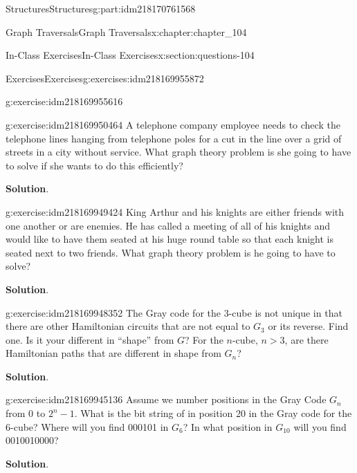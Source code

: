 \documentclass[oneside,10pt,]{book}
\newcommand{\blocktitlefont}{\relax}
\numberwithin{equation}{section}
\newcommand{\gt}{>}
\begin{document}
\begin{partptx}{Structures}{}{Structures}{}{}{g:part:idm218170761568}
\begin{chapterptx}{Graph Traversals}{}{Graph Traversals}{}{}{x:chapter:chapter_104}
\begin{sectionptx}{In-Class Exercises}{}{In-Class Exercises}{}{}{x:section:questions-104}
\begin{exercises-subsection-numberless}{Exercises}{}{Exercises}{}{}{g:exercises:idm218169955872}
\begin{exercisegroup}
\begin{divisionexerciseeg}{1}{}{}{g:exercise:idm218169955616}
\end{divisionexerciseeg}%
\begin{divisionexerciseeg}{2}{}{}{g:exercise:idm218169950464}%
A telephone company employee needs to check the telephone lines hanging from telephone poles for a cut in the line over a grid of streets in a city without service.  What graph theory problem is she going to have to solve if she wants to do this efficiently?%
\par\smallskip%
\noindent\textbf{\blocktitlefont Solution}.\hypertarget{g:solution:idm218169949680}{}\quad{}%
\end{divisionexerciseeg}%
\begin{divisionexerciseeg}{3}{}{}{g:exercise:idm218169949424}%
King Arthur and his knights are either friends with one another or are enemies.  He has called a meeting of all of his knights and would like to have them seated at his huge round table so that each knight is seated next to two friends. What graph theory problem is he going to have to solve?%
\par\smallskip%
\noindent\textbf{\blocktitlefont Solution}.\hypertarget{g:solution:idm218169948608}{}\quad{}%
\end{divisionexerciseeg}%
\begin{divisionexerciseeg}{4}{}{}{g:exercise:idm218169948352}%
The Gray code for the 3-cube is not unique in that there are other Hamiltonian circuits that are not equal to \(G_3\) or its reverse.  Find one.   Is it your different in ``shape'' from \(G\)?   For the \(n\)-cube, \(n \gt 3\), are there Hamiltonian paths that are different in shape from \(G_n\)?%
\par\smallskip%
\noindent\textbf{\blocktitlefont Solution}.\hypertarget{g:solution:idm218169947968}{}\quad{}%
\end{divisionexerciseeg}%
\begin{divisionexerciseeg}{5}{}{}{g:exercise:idm218169945136}%
Assume we number positions in the Gray Code \(G_n\) from 0 to \(2^n-1\).  What is the bit string of in position 20 in the Gray code for the 6-cube? Where will you find 000101 in \(G_6\)?	 In what position in \(G_{10}\) will you find 0010010000?%
\par\smallskip%
\noindent\textbf{\blocktitlefont Solution}.\hypertarget{g:solution:idm218169942912}{}\quad{}%
\end{divisionexerciseeg}%
\end{exercisegroup}
\par\medskip\noindent
\end{exercises-subsection-numberless}

\end{sectionptx}
\end{chapterptx}
\end{partptx}
\end{document}
